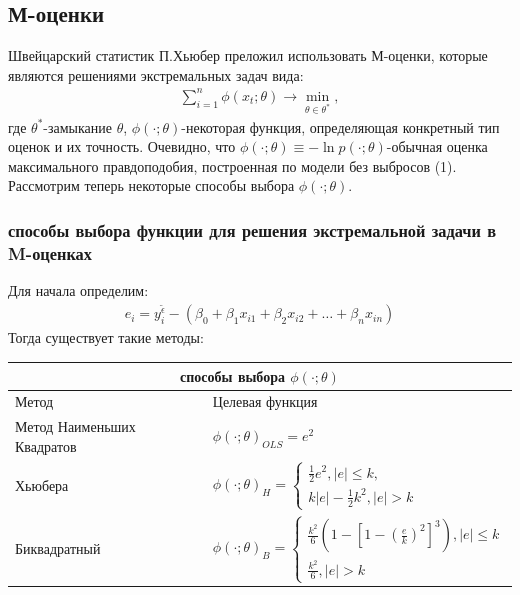 \documentclass[12pt]{article}
\begin{document}
\subsection{М-оценки}
Швейцарский статистик П.Хьюбер преложил использовать М-оценки\cite{Kharin}, которые являются решениями экстремальных задач вида:
\begin{eqnarray}
    \sum_{i=1}^{n}\phi(x_t;\theta)\rightarrow \min_{\theta\in \theta^{*}},
\end{eqnarray}
где $\theta^{*}$-замыкание $\theta$, $\phi(\cdot;\theta)$-некоторая функция, определяющая конкретный тип оценок и их точность.\hfill\break
Очевидно, что $\phi(\cdot;\theta)\equiv - \ln{p(\cdot;\theta)}$-обычная оценка максимального правдоподобия, построенная по модели без выбросов (1).\hfill\break
Рассмотрим теперь некоторые способы выбора $\phi(\cdot;\theta)$.\hfill\break
\subsubsection{способы выбора  функции для решения экстремальной задачи в M-оценках}
Для начала определим:
\begin{eqnarray}
    e_i=y_i^{\widetilde{\epsilon}}-(\beta_0+\beta_1 x_{i1}+\beta_2 x_{i2}+\dots+\beta_n x_{in})
\end{eqnarray}
Тогда существует такие методы\cite{RobustRegression}:\hfill\break
\begin{center}
\begin{tabular}{ |p{3cm}|p{10cm} | }
    \hline
    \multicolumn{2}{|c|}{способы выбора $\phi(\cdot;\theta)$} \\
    \hline
    Метод& Целевая функция\\
    \hline
    Метод Наименьших Квадратов&$\phi(\cdot;\theta)_{OLS}=e^2$\\
    Хьюбера&$\phi(\cdot;\theta)_{H}=
        \begin{cases}
            \frac{1}{2}e^2, |e|\leq k,\\
            k|e|-\frac{1}{2}k^2, |e|>k
        \end{cases}$\\
    Биквадратный& $\phi(\cdot;\theta)_{B}=
    \begin{cases}
        \frac{k^2}{6}(1-[1-(\frac{e}{k})^2]^3), |e|\leq k\\
        \frac{k^2}{6}, |e|>k
    \end{cases}$\\
    \hline
\end{tabular}
\end{center}
\end{document}

